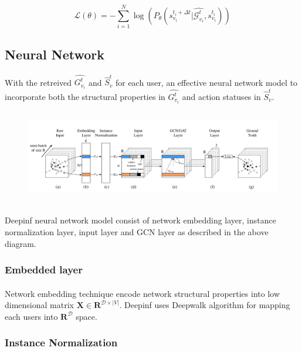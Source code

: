 \begin{equation}
    \mathcal{L}(\theta) = -\sum_{i=1}^N \log(P_{\theta}(s_{v_i}^{t_i+\Delta t}|\hat{\mathcal{G}_{v_i}^{t}},s_{v_i}^{t_i}))
\end{equation}


\subsection{Neural Network}
\paragraph{} With the retreived $\hat{G_{v_i}^{t}}$ and $\hat{S}_v^t$ for each user, an effective
neural network model to incorporate both the structural properties in $\hat{G_{v_i}^{t}}$ and action statuses in 
$\hat{S}_v^t$.

\begin{figure}
    \includegraphics[width=12cm,height=4cm]{tex/img/framework.png}
\end{figure}

\paragraph{} Deepinf neural network model consist of network embedding layer, instance normalization layer, input layer
and GCN layer as described in the above diagram.


\subsubsection{Embedded layer}

\paragraph{} Network embedding technique encode network structural properties into low dimensional matrix $\mathbf{X} \in
\mathbf{R}^{\mathcal{D} \times |V|}$. Deepinf uses Deepwalk algorithm for mapping each users into $\mathbf{R}^{\mathcal{D}}$
space.


\subsubsection{Instance Normalization}

